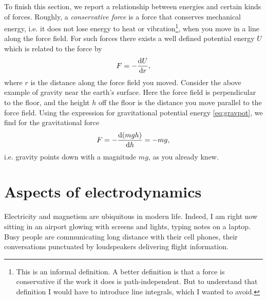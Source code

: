 To finish this section, we report a relationship between energies and certain
kinds of forces. Roughly, a {\it conservative force} 
is a force that conserves mechanical energy, i.e. it does not lose energy to heat or
vibration\footnote{This is an informal definition. A better definition is that
a force is conservative if the work it does is path-independent. But to
understand that definition I would have to introduce line integrals, which I
wanted to avoid.}, when you move in a line along the force field. 
For such forces there exists a well defined potential energy
$U$ which is related to the force by
\begin{equation}
F=-\dv{U}{r},
\end{equation}
where $r$ is the distance along the force field you moved. Consider the above
example of gravity near the earth's surface. Here the force field is
perpendicular to the floor, and the height $h$ off the floor is the distance you
move parallel to the force field. Using the expression for gravitational
potential energy \eqref{eq:gravpot}, we find for the gravitational force
\begin{equation}
F=-\dv{(mgh)}{h}=-mg,
\end{equation}
i.e. gravity points down with a magnitude $mg$, as you already knew.

\section{Aspects of electrodynamics}\label{sec:EM}

Electricity and magnetism are ubiquitous in modern life. Indeed, I am right now sitting 
in an airport glowing with screens and lights, typing notes on a laptop. Busy
people are communicating long distance with their cell phones, their
conversations punctuated by loudspeakers delivering flight information.

